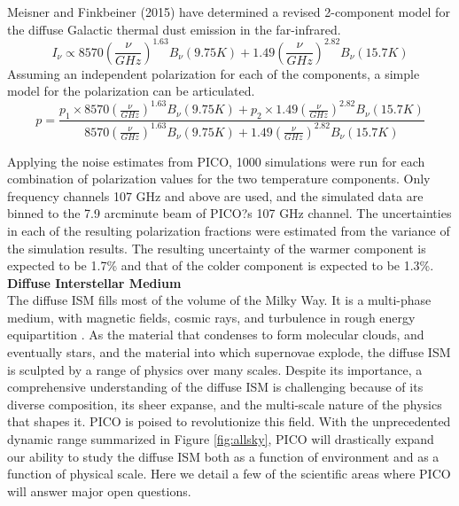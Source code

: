 \documentclass[PICOReport.tex]{subfiles}
\begin{document}
Meisner and Finkbeiner (2015) have determined a revised 2-component model for the diffuse Galactic thermal dust 
emission in the
far-infrared.
\begin{equation}
I_\nu \propto 8570\left(\frac{\nu}{GHz}\right)^{1.63} B_\nu(9.75 K) + 1.49 \left(\frac{\nu}{GHz}\right)^{2.82} B_\nu(15.7 K)
\end{equation}
Assuming an independent polarization for each of the components, a simple model for the polarization can be articulated.
\begin{equation}
p=\frac{p_1\times8570\left(\frac{\nu}{GHz}\right)^{1.63} B_\nu(9.75 K) + p_2\times1.49 \left(\frac{\nu}{GHz}\right)^{2.82} B_\nu(15.7 K)}{8570\left(\frac{\nu}{GHz}\right)^{1.63} B_\nu(9.75 K) + 1.49 \left(\frac{\nu}{GHz}\right)^{2.82} B_\nu(15.7 K)}
\end{equation}

Applying the noise estimates from PICO, 1000 simulations
were run for each combination of polarization values
for the two temperature components. Only frequency
channels 107 GHz and above are used, and the simulated
data are binned to the 7.9 arcminute beam of PICO?s
107 GHz channel. The uncertainties in each of the resulting
polarization fractions were estimated from the variance
of the simulation results. The resulting uncertainty of
the warmer component is expected to be 1.7\% and that
of the colder component is expected to be 1.3\%. \\

{\bf Diffuse Interstellar Medium} \\[0.3cm]
The diffuse ISM fills most of the volume of the Milky Way. It is a multi-phase medium, with magnetic fields, cosmic rays, and turbulence in rough energy equipartition \citep[e.g.,][]{Heiles:2005}. As the material that condenses to form molecular clouds, and eventually stars, and the material into which supernovae explode, the diffuse ISM is sculpted by a range of physics over many scales. Despite its importance, a comprehensive understanding of the diffuse ISM is challenging because of its diverse composition, its sheer expanse, and the multi-scale nature of the physics that shapes it. PICO is poised to revolutionize this field. With the unprecedented dynamic range summarized in Figure \ref{fig:allsky}, PICO will drastically expand our ability to study the diffuse ISM both as a function of environment and as a function of physical scale. Here we detail a few of the scientific areas where PICO will answer major open questions. \\
\end{document}
